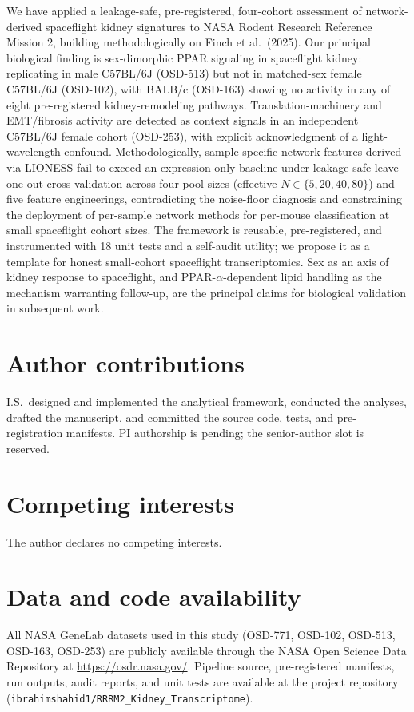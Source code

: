 \documentclass[11pt]{article}
\newcommand{\code}[1]{\texttt{#1}}
\begin{document}
We have applied a leakage-safe, pre-registered, four-cohort assessment of network-derived spaceflight kidney signatures to NASA Rodent Research Reference Mission 2, building methodologically on Finch et al.\ (2025). Our principal biological finding is sex-dimorphic PPAR signaling in spaceflight kidney: replicating in male C57BL/6J (OSD-513) but not in matched-sex female C57BL/6J (OSD-102), with BALB/c (OSD-163) showing no activity in any of eight pre-registered kidney-remodeling pathways. Translation-machinery and EMT/fibrosis activity are detected as context signals in an independent C57BL/6J female cohort (OSD-253), with explicit acknowledgment of a light-wavelength confound. Methodologically, sample-specific network features derived via LIONESS fail to exceed an expression-only baseline under leakage-safe leave-one-out cross-validation across four pool sizes (effective $N\in\{5,20,40,80\}$) and five feature engineerings, contradicting the noise-floor diagnosis and constraining the deployment of per-sample network methods for per-mouse classification at small spaceflight cohort sizes. The framework is reusable, pre-registered, and instrumented with 18 unit tests and a self-audit utility; we propose it as a template for honest small-cohort spaceflight transcriptomics. Sex as an axis of kidney response to spaceflight, and PPAR-$\alpha$-dependent lipid handling as the mechanism warranting follow-up, are the principal claims for biological validation in subsequent work.

\section*{Author contributions}

I.S.\ designed and implemented the analytical framework, conducted the analyses, drafted the manuscript, and committed the source code, tests, and pre-registration manifests. PI authorship is pending; the senior-author slot is reserved.

\section*{Competing interests}
The author declares no competing interests.

\section*{Data and code availability}
All NASA GeneLab datasets used in this study (OSD-771, OSD-102, OSD-513, OSD-163, OSD-253) are publicly available through the NASA Open Science Data Repository at \url{https://osdr.nasa.gov/}. Pipeline source, pre-registered manifests, run outputs, audit reports, and unit tests are available at the project repository (\code{ibrahimshahid1/RRRM2\_Kidney\_Transcriptome}).
\end{document}
